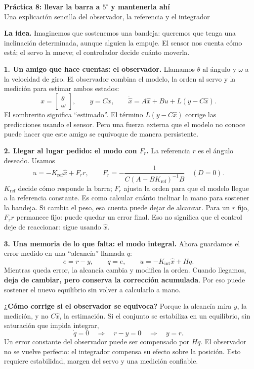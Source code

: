 \documentclass[11pt,a4paper]{article}
\begin{document}
\begin{center}
{\Large\bfseries Práctica 8: llevar la barra a $5^\circ$ y mantenerla ahí}\\[3pt]
{\small Una explicación sencilla del observador, la referencia y el integrador}
\end{center}

\textbf{La idea.} Imaginemos que sostenemos una bandeja: queremos que tenga una
inclinación determinada, aunque alguien la empuje. El sensor nos cuenta cómo está;
el servo la mueve; el controlador decide cuánto moverla.

\textbf{1. Un amigo que hace cuentas: el observador.}
Llamamos $\theta$ al ángulo y $\omega$ a la velocidad de giro. El observador combina
el modelo, la orden al servo y la medición para estimar ambos estados:
\[
 x=\begin{bmatrix}\theta\\\omega\end{bmatrix},\qquad
 y=Cx,\qquad
 \dot{\hat x}=A\hat x+Bu+L(y-C\hat x).
\]
El sombrerito significa ``estimado''. El término $L(y-C\hat x)$ corrige las
predicciones usando el sensor. Pero una fuerza externa que el modelo no conoce
puede hacer que este amigo se equivoque de manera persistente.

\textbf{2. Llegar al lugar pedido: el modo con $F_r$.}
La referencia $r$ es el ángulo deseado. Usamos
\[
 \boxed{u=-K_{\mathrm{ref}}\hat x+F_r r},\qquad
 F_r=-\frac{1}{C(A-BK_{\mathrm{ref}})^{-1}B}\quad(D=0).
\]
$K_{\mathrm{ref}}$ decide cómo responde la barra; $F_r$ ajusta la orden para que
el modelo llegue a la referencia constante. Es como calcular cuánto inclinar
la mano para sostener la bandeja. Si cambia el peso, esa cuenta puede dejar de
alcanzar. Para un $r$ fijo, $F_r r$ permanece fijo: puede quedar un error final.
Eso no significa que el control deje de reaccionar: sigue usando $\hat x$.

\textbf{3. Una memoria de lo que falta: el modo integral.}
Ahora guardamos el error medido en una ``alcancía'' llamada $q$:
\[
 \boxed{e=r-y,\qquad \dot q=e,\qquad u=-K_{\mathrm{int}}\hat x+Hq}.
\]
Mientras queda error, la alcancía cambia y modifica la orden. Cuando llegamos,
\textbf{deja de cambiar, pero conserva la corrección acumulada}. Por eso puede
sostener el nuevo equilibrio sin volver a calcularlo a mano.

\textbf{¿Cómo corrige si el observador se equivoca?}
Porque la alcancía mira $y$, la medición, y no $C\hat x$, la estimación.
Si el conjunto se estabiliza en un equilibrio, sin saturación que impida integrar,
\[
 \dot q=0\quad\Longrightarrow\quad r-y=0\quad\Longrightarrow\quad \boxed{y=r}.
\]
Un error constante del observador puede ser compensado por $Hq$. El observador
no se vuelve perfecto: el integrador compensa su efecto sobre la posición.
Esto requiere estabilidad, margen del servo y una medición confiable.
\end{document}
